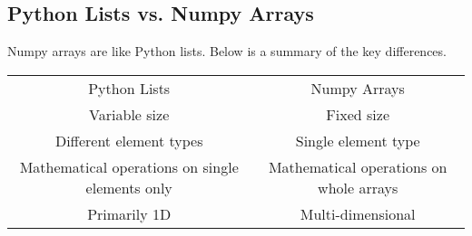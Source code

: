 \subsection{Python Lists vs. Numpy Arrays}
Numpy arrays are like Python lists. Below is a summary of the key differences.
\begin{tabular*}{\linewidth}{c c}
    Python Lists & Numpy Arrays\\
    Variable size & Fixed size\\
    Different element types & Single element type\\
    Mathematical operations on single elements only & Mathematical operations on whole arrays\\
    Primarily 1D & Multi-dimensional\\
\end{tabular*}
